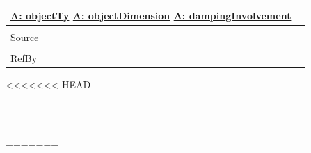 \documentclass[12pt]{article}
\begin{document}
\begin{minipage}{\textwidth}
\begin{tabular}{p{} p{}}
                                                          \hyperref[assumpOT]{A: objectTy}
                                                          \hyperref[assumpOD]{A: objectDimension}
                                                          \hyperref[assumpDI]{A: dampingInvolvement}
                                                          \\ \midrule \\
                                                          Source & \\ \midrule \\
                                                                   RefBy & 
\\ \bottomrule \end{tabular}
<<<<<<< HEAD
\end{minipage}\\
~\newline
 \noindent \begin{minipage}{\textwidth}
=======
\end{minipage}
\par~
\end{document}
